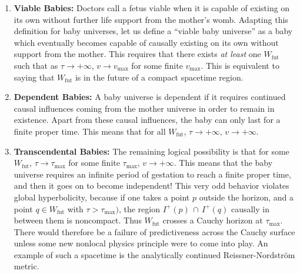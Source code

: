 \documentclass[12pt]{article}
\begin{document}
\begin{enumerate}
\item \textbf{Viable Babies:} Doctors call a fetus viable when it is capable of existing on its own without further life support from the mother's womb.  Adapting this definition for baby universes, let us define a ``viable baby universe'' as a baby which eventually becomes capable of causally existing on its own without support from the mother.  This requires that there exists \emph{at least} one $W_\mathrm{fut}$ such that as $\tau \to +\infty$, $v \to v_\mathrm{max}$ for some finite $v_\mathrm{max}$.  This is equivalent to saying that $W_\mathrm{fut}$ is in the future of a compact spacetime region.

\item \textbf{Dependent Babies:} A baby universe is dependent if it requires continued causal influences coming from the mother universe in order to remain in existence.  Apart from these causal influences, the baby can only last for a finite proper time.  This means that for all $W_\mathrm{fut}$, $\tau \to +\infty$, $v \to +\infty$.

\item \textbf{Transcendental Babies:} The remaining logical possibility is that for some $W_\mathrm{fut}$, $\tau \to \tau_\mathrm{max}$ for some finite $\tau_\mathrm{max}$, $v \to +\infty$.  This means that the baby universe requires an infinite period of gestation to reach a finite proper time, and then it goes on to become independent!  This very odd behavior violates global hyperbolicity, because if one takes a point $p$ outside the horizon, and a point $q \in W_\mathrm{fut}$ with $\tau > \tau_\mathrm{max})$, the region $I^+(p)\,\cap\,I^+(q)$ causally in between them is noncompact.  Thus $W_\mathrm{fut}$ crosses a Cauchy horizon at $\tau_\mathrm{max}$.  There would therefore be a failure of predictiveness across the Cauchy surface unless some new nonlocal physics principle were to come into play.  An example of such a spacetime is the analytically continued Reissner-Nordstr\"{o}m metric.
\end{enumerate}
\end{document}
